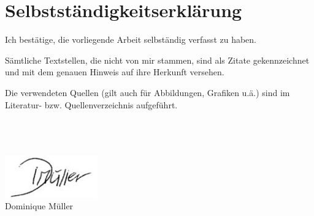 
\chapter{Selbstständigkeitserklärung}

Ich bestätige, die vorliegende Arbeit selbständig verfasst zu haben. 

Sämtliche Textstellen, die nicht von mir stammen, sind als Zitate gekennzeichnet und mit dem genauen Hinweis auf ihre Herkunft versehen.

Die verwendeten Quellen (gilt auch für Abbildungen, Grafiken u.ä.) sind im Literatur- bzw. Quellenverzeichnis aufgeführt.
\\
\\
\\
\\
\begin{center}
\includegraphics[width=4cm]{Grafiken/unterschrift.jpg}\\

\vspace{0.5cm}
Dominique Müller
\end{center}

